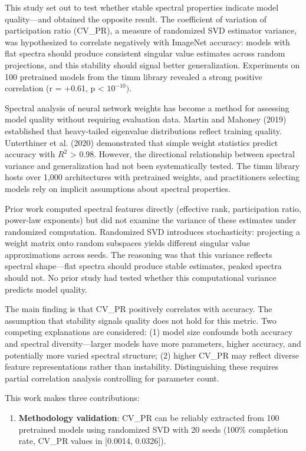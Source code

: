 
This study set out to test whether stable spectral properties indicate model quality---and obtained the opposite result. The coefficient of variation of participation ratio (CV\_PR), a measure of randomized SVD estimator variance, was hypothesized to correlate negatively with ImageNet accuracy: models with flat spectra should produce consistent singular value estimates across random projections, and this stability should signal better generalization. Experiments on 100 pretrained models from the timm library revealed a strong positive correlation (r = +0.61, p < $10^{-10})$.

Spectral analysis of neural network weights has become a method for assessing model quality without requiring evaluation data. Martin and Mahoney (2019) established that heavy-tailed eigenvalue distributions reflect training quality. Unterthiner et al. (2020) demonstrated that simple weight statistics predict accuracy with $R^2$ > 0.98. However, the directional relationship between spectral variance and generalization had not been systematically tested. The timm library hosts over 1,000 architectures with pretrained weights, and practitioners selecting models rely on implicit assumptions about spectral properties.

Prior work computed spectral features directly (effective rank, participation ratio, power-law exponents) but did not examine the variance of these estimates under randomized computation. Randomized SVD introduces stochasticity: projecting a weight matrix onto random subspaces yields different singular value approximations across seeds. The reasoning was that this variance reflects spectral shape---flat spectra should produce stable estimates, peaked spectra should not. No prior study had tested whether this computational variance predicts model quality.

The main finding is that CV\_PR positively correlates with accuracy. The assumption that stability signals quality does not hold for this metric. Two competing explanations are considered: (1) model size confounds both accuracy and spectral diversity---larger models have more parameters, higher accuracy, and potentially more varied spectral structure; (2) higher CV\_PR may reflect diverse feature representations rather than instability. Distinguishing these requires partial correlation analysis controlling for parameter count.

This work makes three contributions:

\begin{enumerate}
\item \textbf{Methodology validation}: CV\_PR can be reliably extracted from 100 pretrained models using randomized SVD with 20 seeds (100\% completion rate, CV\_PR values in [0.0014, 0.0326]).
\end{enumerate}


